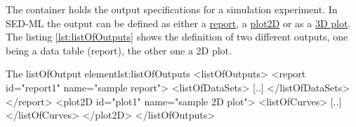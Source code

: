 \label{sec:listOfOutputs}

%
The  container holds the output specifications for a simulation experiment. In SED-ML the output can be defined as either a \hyperref[class:report]{report}, a \hyperref[class:2dPlot]{plot2D} or  as a \hyperref[class:plot3D]{3D plot}. The listing \ref{lst:listOfOutputs} shows the definition of two different outputs, one being a data table (report), the other one a 2D plot.
%
\begin{myXmlLst}{The listOfOutput element}{lst:listOfOutputs}
<listOfOutputs>
 <report id="report1" name="sample report">
  <listOfDataSets>
   [..]
  </listOfDataSets>
 </report>
 <plot2D id="plot1" name="sample 2D plot">
  <listOfCurves> 
   [..] 
  </listOfCurves>
 </plot2D>
</listOfOutputs>
\end{myXmlLst}
%

